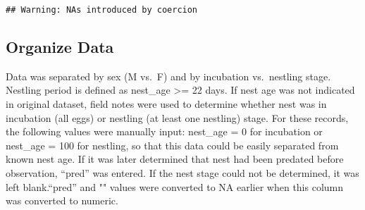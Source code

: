 \documentclass[
]{article}
\begin{document}
\begin{verbatim}
## Warning: NAs introduced by coercion
\end{verbatim}

\hypertarget{organize-data}{%
\subsection{Organize Data}\label{organize-data}}

Data was separated by sex (M vs.~F) and by incubation vs.~nestling
stage. Nestling period is defined as nest\_age \textgreater= 22 days. If
nest age was not indicated in original dataset, field notes were used to
determine whether nest was in incubation (all eggs) or nestling (at
least one nestling) stage. For these records, the following values were
manually input: nest\_age = 0 for incubation or nest\_age = 100 for
nestling, so that this data could be easily separated from known nest
age. If it was later determined that nest had been predated before
observation, ``pred'' was entered. If the nest stage could not be
determined, it was left blank.``pred'' and "" values were converted to
NA earlier when this column was converted to numeric.
\end{document}
